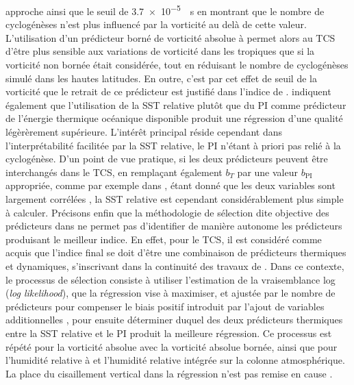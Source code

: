 \documentclass[../main.tex]{subfiles}
\begin{document}
approche ainsi que le seuil de \SI{3.7e-5}{\per\second} en montrant que le nombre de cyclogénèses n'est plus influencé par la vorticité au delà de cette valeur.
L'utilisation d'un prédicteur borné de vorticité absolue à  permet alors au TCS d'être plus sensible aux variations de vorticité dans les tropiques que
si la vorticité non bornée était considérée, tout en réduisant le nombre de cyclogénèses simulé dans les hautes latitudes. En outre, c'est par cet effet de
seuil de la vorticité que le retrait de ce prédicteur est justifié dans l'indice de \textcite{bruyere_investigating_2012}. \citeauthor{tippett_poisson_2011}
indiquent également que l'utilisation de la SST relative plutôt que du PI comme prédicteur de l'énergie thermique océanique disponible produit une régression
d'une qualité légèrèrement supérieure. L'intérêt principal réside cependant dans l'interprétabilité facilitée par la SST relative, le PI n'étant à priori pas
relié à la cyclogénèse. D'un point de vue pratique, si les deux prédicteurs peuvent être interchangés dans le TCS, en remplaçant également $b_T$ par une valeur
$b_{\mathrm{PI}}$ appropriée, comme par exemple dans \textcite{camargo_testing_2014,camargo_tropical_2016}, étant donné que les deux variables sont largement
corrélées \parencite{vecchi_effect_2007,swanson_nonlocality_2008}, la SST relative est cependant considérablement plus simple à calculer. Précisons enfin que la
méthodologie de sélection dite objective des prédicteurs dans \textcite{tippett_poisson_2011} ne permet pas d'identifier de manière autonome les prédicteurs
produisant le meilleur indice. En effet, pour le TCS, il est considéré comme acquis que l'indice final se doit d'être une combinaison de prédicteurs thermiques
et dynamiques, s'inscrivant dans la continuité des travaux de \textcite{gray_tropical_1975}. Dans ce contexte, le processus de sélection consiste à utiliser
l'estimation de la vraisemblance log (\textit{log likelihood}), que la régression vise à maximiser, et ajustée par le nombre de prédicteurs pour compenser le
biais positif introduit par l'ajout de variables additionnelles \parencite{akaike_information_1998}, pour ensuite déterminer duquel des deux prédicteurs
thermiques entre la SST relative et le PI produit la meilleure régression. Ce processus est répété pour la vorticité absolue avec la vorticité absolue bornée,
ainsi que pour l'humidité relative à  et l'humidité relative intégrée sur la colonne atmosphérique. La place du cisaillement vertical dans la
régression n'est pas remise en cause \parencite{gray_global_1968}.
%
\end{document}
